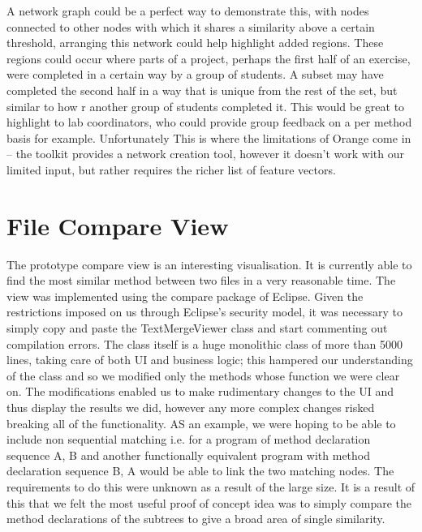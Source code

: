 A network graph could be a perfect way to demonstrate this, with nodes connected
to other nodes with which it shares a similarity above a certain threshold,
arranging this network could help highlight added regions. These regions could
occur where parts of a project, perhaps the first half of an exercise, were
completed in a certain way by a group of students. A subset may have completed
the second half in a way that is unique from the rest of the set, but similar
to how r another group of students completed it. This would be great to
highlight to lab coordinators, who could provide group feedback on a per method
basis for example. Unfortunately This is where the limitations of Orange come in
-- the toolkit provides a network creation tool, however it doesn't work with
our limited input, but rather requires the richer list of feature vectors.

\section{File Compare View}
The prototype compare view is an interesting visualisation. It is currently able
to find the most similar method between two files in a very reasonable time.
The view was implemented using the compare package of Eclipse.
Given the restrictions imposed on us through Eclipse's security model, it
was necessary to simply copy and paste the TextMergeViewer class and start
commenting out compilation errors. The class itself is a huge monolithic
class of more than 5000 lines, taking care of both UI and business logic;
this hampered our understanding of the class and so we modified only the 
methods whose function we were clear on. The modifications enabled us to
make rudimentary changes to the UI and thus display the results we did,
however any more complex changes risked breaking all of the functionality.
AS an example, we were hoping to be able to include non sequential matching
i.e. for a program of method declaration sequence A, B and another functionally
equivalent program with method declaration sequence B, A would be able to link
the two matching nodes. The requirements to do this were unknown as a result
of the large size. It is a result of this that we felt the most useful
proof of concept idea was to simply compare the method declarations of the
subtrees to give a broad area of single similarity.